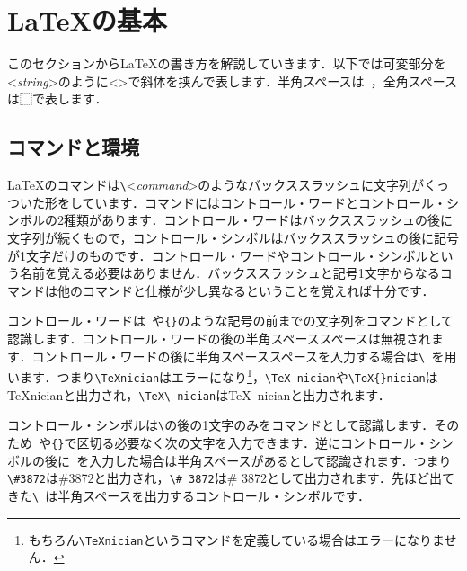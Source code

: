 \section{\LaTeX の基本}
このセクションから\LaTeX の書き方を解説していきます．以下では可変部分を<\textit{string}>のように<>で斜体を挟んで表します．半角スペースは\verb*| |，全角スペースは⬚で表します．
\subsection{コマンドと環境}
\LaTeX のコマンドは\verb|\|<\textit{command}>のようなバックススラッシュに文字列がくっついた形をしています．コマンドにはコントロール・ワードとコントロール・シンボルの2種類があります．コントロール・ワードはバックススラッシュの後に文字列が続くもので，コントロール・シンボルはバックススラッシュの後に記号が1文字だけのものです．コントロール・ワードやコントロール・シンボルという名前を覚える必要はありません．バックススラッシュと記号1文字からなるコマンドは他のコマンドと仕様が少し異なるということを覚えれば十分です．

コントロール・ワードは\verb*| |や\verb*|{}|のような記号の前までの文字列をコマンドとして認識します．コントロール・ワードの後の半角スペーススペースは無視されます．コントロール・ワードの後に半角スペーススペースを入力する場合は\verb*|\ |を用います．つまり\verb*|\TeXnician|はエラーになり\footnote{もちろん\texttt{\textbackslash TeXnician}というコマンドを定義している場合はエラーになりません．}，\verb*|\TeX nician|や\verb*|\TeX{}nician|は\TeX nicianと出力され，\verb*|\TeX\ nician|は\TeX\ nicianと出力されます．

コントロール・シンボルは\verb*|\|の後の1文字のみをコマンドとして認識します．そのため\verb*| |や\verb*|{}|で区切る必要なく次の文字を入力できます．逆にコントロール・シンボルの後に\verb*| |を入力した場合は半角スペースがあるとして認識されます．つまり\verb*|\#3872|は\#3872と出力され，\verb*|\# 3872|は\# 3872として出力されます．先ほど出てきた\verb*|\ |は半角スペースを出力するコントロール・シンボルです．

